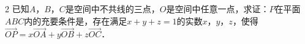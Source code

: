 \documentclass[fontset=none]{ctexart}
\begin{document}
\begin{multicols}{2}
 已知\(A\)，\(B\)，\(C\)是空间中不共线的三点，\(O\)是空间中任意一点，求证：\(P\)在平面\(ABC\)内的充要条件是，存在满足\(x+y+z=1\)的实数\(x\)，\(y\)，\(z\)，使得\(\overrightarrow{OP}=x\overrightarrow{OA}+y\overrightarrow{OB}+z\overrightarrow{OC}\)．
\xiexwei{16mm}
\begin{ansblock}[练-课时03-16]
\setlength{\anshang}{7.6mm}%
\end{ansblock}

\end{multicols}

\tailfill
\end{document}
